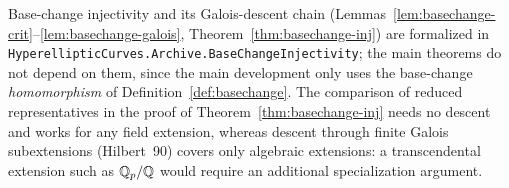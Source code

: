\begin{remark}[Formalization]
Base-change injectivity and its Galois-descent chain
(Lemmas~\ref{lem:basechange-crit}--\ref{lem:basechange-galois},
Theorem~\ref{thm:basechange-inj}) are formalized in
\texttt{HyperellipticCurves.Archive.BaseChangeInjectivity}; the main theorems do not depend on
them, since the main development only uses the base-change \emph{homomorphism} of
Definition~\ref{def:basechange}. The comparison of reduced representatives in the proof of
Theorem~\ref{thm:basechange-inj} needs no descent and works for any field extension, whereas
descent through finite Galois subextensions (Hilbert~90) covers only algebraic extensions: a
transcendental extension such as $\mathbb{Q}_p/\mathbb{Q}$ would require an additional specialization
argument.
\end{remark}
